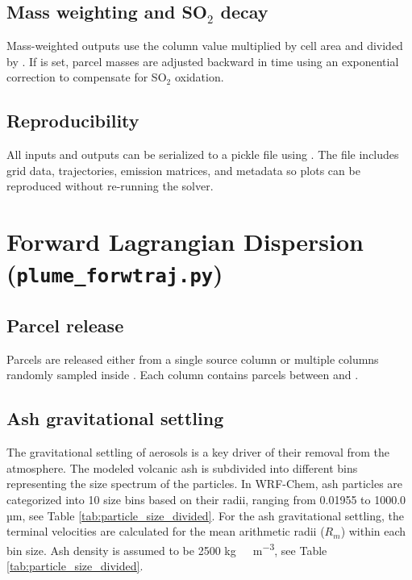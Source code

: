 \documentclass[11pt]{article}
\begin{document}
\subsection{Mass weighting and SO$_2$ decay}
Mass-weighted outputs use the column value multiplied by cell area and divided
by . If  is set, parcel masses are
adjusted backward in time using an exponential correction to compensate for SO$_2$
oxidation.

\subsection{Reproducibility}
All inputs and outputs can be serialized to a pickle file using
. The file includes grid data, trajectories, emission
matrices, and metadata so plots can be reproduced without re-running the solver.

\section{Forward Lagrangian Dispersion (\texttt{plume\_forwtraj.py})}
\subsection{Parcel release}
Parcels are released either from a single source column or multiple columns
randomly sampled inside . Each column contains
 parcels between  and .


\subsection{Ash gravitational settling}

The gravitational settling of aerosols is a key driver of their removal from the atmosphere. The modeled volcanic ash is subdivided into different bins representing the size spectrum of the particles. In WRF-Chem, ash particles are categorized into 10 size bins based on their radii, ranging from 0.01955 to 1000.0 µm, see Table \ref{tab:particle_size_divided}. For the ash gravitational settling, the terminal velocities are calculated for the mean arithmetic radii ($R_{m}$) within each bin size. Ash density is assumed to be 2500 \unit{kg\ m^{-3}}, see Table \ref{tab:particle_size_divided}.
\end{document}
